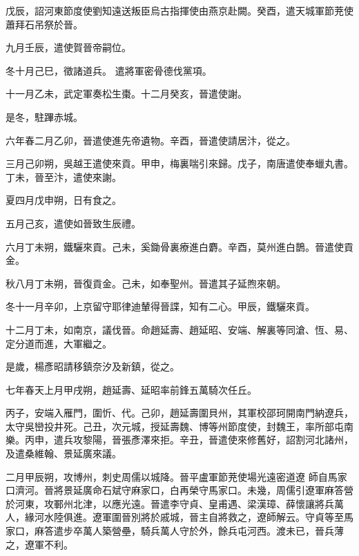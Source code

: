 \begin{pinyinscope}
 戊辰，詔河東節度使劉知遠送叛臣烏古指揮使由燕京赴闕。癸酉，遣天城軍節茺使蕭拜石吊祭於晉。



 九月壬辰，遣使賀晉帝嗣位。



 冬十月己巳，徵諸道兵。
 遣將軍密骨德伐黨項。



 十一月乙未，武定軍奏松生棗。十二月癸亥，晉遣使謝。



 是冬，駐蹕赤城。



 六年春二月乙卯，晉遣使進先帝遺物。辛酉，晉遣使請居汴，從之。



 三月己卯朔，吳越王遣使來貢。甲申，梅裏喘引來歸。戊子，南唐遣使奉蠟丸書。丁未，晉至汴，遣使來謝。



 夏四月戊申朔，日有食之。



 五月己亥，遣使如晉致生辰禮。



 六月丁未朔，鐵驪來貢。己未，奚鋤骨裏療進白麝。辛酉，莫州進白鵲。晉遣使貢金。



 秋八月丁未朔，晉復貢金。己未，如奉聖州。晉遣其子延煦來朝。



 冬十一月辛卯，上京留守耶律迪輦得晉諜，知有二心。甲辰，鐵驪來貢。



 十二月丁未，如南京，議伐晉。命趙延壽、趙延昭、安端、解裏等同滄、恆、易、定分道而進，大軍繼之。



 是歲，楊彥昭請移鎮奈汐及新鎮，從之。



 七年春天上月甲戌朔，趙延壽、延昭率前鋒五萬騎次任丘。



 丙子，安端入雁門，圍忻、代。己卯，趙延壽圍貝州，其軍校邵珂開南門納遼兵，太守吳巒投井死。己丑，次元城，授延壽魏、博等州節度使，封魏王，率所部屯南樂。丙申，遣兵攻黎陽，晉張彥澤來拒。辛丑，晉遣使來修舊好，詔割河北諸州，及遣桑維翰、景延廣來議。



 二月甲辰朔，攻博州，刺史周儒以城降。晉平盧軍節茺使場光遠密道遼
 師自馬家口濟河。晉將景延廣命石斌守麻家口，白再榮守馬家口。未幾，周儒引遼軍麻答營於河東，攻鄆州北津，以應光遠。晉遣李守貞、皇甫遇、梁漢璋、薛懷讓將兵萬人，緣河水陸俱進。遼軍圍晉別將於戚城，晉主自將救之，遼師解云。守貞等至馬家口，麻答遣步卒萬人築營壘，騎兵萬人守於外，餘兵屯河西。渡未已，晉兵薄之，遼軍不利。




\end{pinyinscope}
